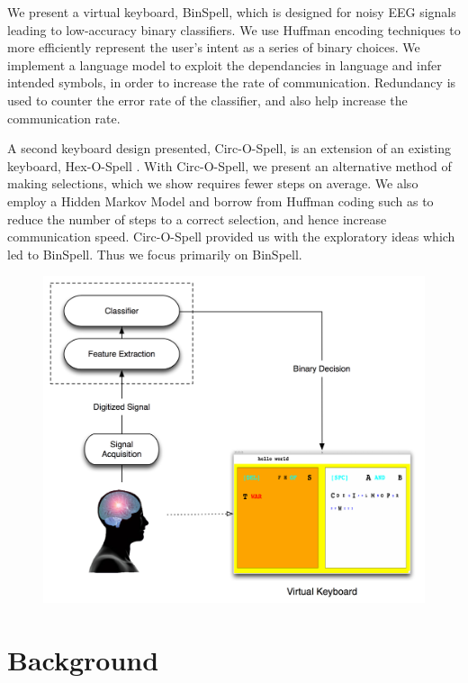 \documentclass[12pt,titlepage]{article}
\begin{document}
We present a virtual keyboard, BinSpell, which is designed for noisy EEG signals leading to low-accuracy binary classifiers.  We use Huffman encoding techniques to more efficiently represent the user's intent as a series of binary choices.  We implement a language model to exploit the dependancies in language and infer intended symbols, in order to increase the rate of communication. Redundancy is used to counter the error rate of the classifier, and also help increase the communication rate.

A second keyboard design presented, Circ-O-Spell, is an extension of an existing keyboard, 
Hex-O-Spell \cite{blankertz_advanced}.  With Circ-O-Spell, we present an alternative method of making selections, which we show requires fewer steps on average.  We also employ a Hidden Markov Model and 
borrow from Huffman coding such as to reduce the number of steps to a correct selection, and 
hence increase communication speed.  Circ-O-Spell provided us with the exploratory ideas 
which led to BinSpell.  Thus we focus primarily on BinSpell.

\begin{figure}[t]
\begin{center}
	\includegraphics[scale=0.40]{Figure1.jpg}
	\label{fig:BCI}
\end{center}
\end{figure}

\section{Background}
\end{document}
